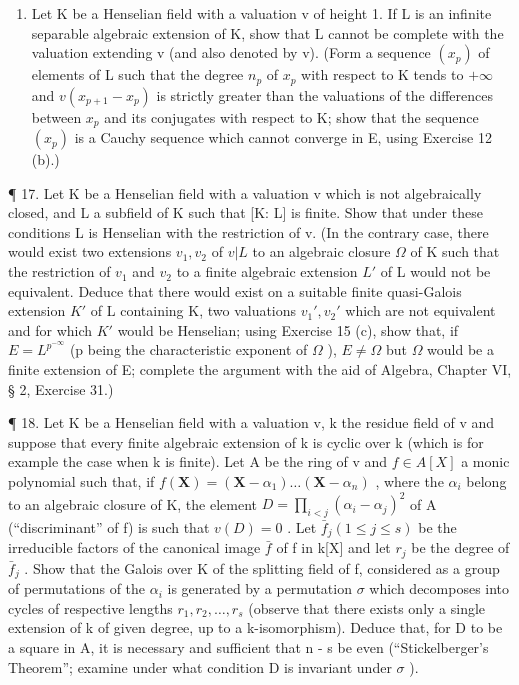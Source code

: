 \begin{enumerate}
\def\labelenumi{\arabic{enumi}.}
\setcounter{enumi}{15}
\tightlist
\item
  Let K be a Henselian field with a valuation v of height 1. If L is an infinite separable algebraic extension of K, show that L cannot be complete with the valuation extending v (and also denoted by v). (Form a sequence \((x_{p})\) of elements of L such that the degree \(n_{p}\) of \(x_{p}\) with respect to K tends to \(+\infty\) and \(v(x_{p+1}-x_{p})\) is strictly greater than the valuations of the differences between \(x_{p}\) and its conjugates with respect to K; show that the sequence \((x_{p})\) is a Cauchy sequence which cannot converge in E, using Exercise 12 (b).)
\end{enumerate}

¶ 17. Let K be a Henselian field with a valuation v which is not algebraically closed, and L a subfield of K such that {[}K: L{]} is finite. Show that under these conditions L is Henselian with the restriction of v. (In the contrary case, there would exist two extensions \(v_{1}, v_{2}\) of \(v|L\) to an algebraic closure \(\Omega\) of K such that the restriction of \(v_{1}\) and \(v_{2}\) to a finite algebraic extension \(L'\) of L would not be equivalent. Deduce that there would exist on a suitable finite quasi-Galois extension \(K'\) of L containing K, two valuations \(v_{1}', v_{2}'\) which are not equivalent and for which \(K'\) would be Henselian; using Exercise 15 (c), show that, if \(E = L^{p^{-\infty}}\) (p being the characteristic exponent of \(\Omega\) ), \(E \neq \Omega\) but \(\Omega\) would be a finite extension of E; complete the argument with the aid of Algebra, Chapter VI, § 2, Exercise 31.)

¶ 18. Let K be a Henselian field with a valuation v, k the residue field of v and suppose that every finite algebraic extension of k is cyclic over k (which is for example the case when k is finite). Let A be the ring of v and \(f \in A[X]\) a monic polynomial such that, if \(f(\mathbf{X}) = (\mathbf{X} - \alpha_{1}) \ldots (\mathbf{X} - \alpha_{n})\) , where the \(\alpha_{i}\) belong to an algebraic closure of K, the element \(D = \prod_{i < j} (\alpha_{i} - \alpha_{j})^{2}\) of A (``discriminant'' of f) is such that \(v(D) = 0\) . Let \(\bar{f}_{j} (1 \leqslant j \leqslant s)\) be the irreducible factors of the canonical image \(\bar{f}\) of f in k{[}X{]} and let \(r_{j}\) be the degree of \(\bar{f}_{j}\) . Show that the Galois over K of the splitting field of f, considered as a group of permutations of the \(\alpha_{i}\) is generated by a permutation \(\sigma\) which decomposes into cycles of respective lengths \(r_{1}, r_{2}, \ldots, r_{s}\) (observe that there exists only a single extension of k of given degree, up to a k-isomorphism). Deduce that, for D to be a square in A, it is necessary and sufficient that n - s be even (``Stickelberger's Theorem''; examine under what condition D is invariant under \(\sigma\) ).

